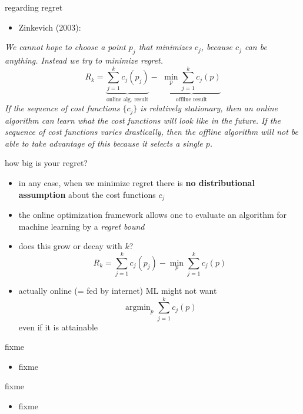 \documentclass[xcolor={svgnames},
               hyperref={colorlinks,citecolor=DeepPink4,linkcolor=FireBrick,urlcolor=Maroon}]
               {beamer}
\newcommand{\argmin}{\operatorname{argmin}}
\begin{document}
\begin{frame}{regarding regret}

\begin{itemize}
\item Zinkevich (2003): 
\end{itemize}

\emph{We cannot hope to choose a point $p_j$ that minimizes $c_j$, because $c_j$ can be anything. Instead we try to minimize regret.}
  $$R_k = \underbrace{\sum_{j=1}^k c_j(p_j)}_{\text{online alg.~result}} - \,\, \underbrace{\min_p \sum_{j=1}^k c_j(p)}_{\text{offline result}}$$
\noindent \emph{If the sequence of cost functions $\{c_j\}$ is relatively stationary, then an online algorithm can learn what the cost functions will look like in the future.  If the sequence of cost functions varies drastically, then the offline algorithm will not be able to take advantage of this because it selects a single $p$.}
\end{frame}


\begin{frame}{how big is your regret?}

\begin{itemize}
\item in any case, when we minimize regret there is \textbf{no distributional assumption} about the cost functions $c_j$
\item the online optimization framework allows one to evaluate an algorithm for machine learning by a \emph{regret bound}
\item does this grow or decay with $k$?
    $$R_k = \sum_{j=1}^k c_j(p_j) - \min_p \sum_{j=1}^k c_j(p)$$
\item actually online (= fed by internet) ML might not want
    $$\argmin_p \sum_{j=1}^k c_j(p)$$
even if it is attainable
\end{itemize}
\end{frame}


\begin{frame}{fixme}

\begin{itemize}
\item fixme
\end{itemize}
\end{frame}

\begin{frame}{fixme}

\begin{itemize}
\item fixme
\end{itemize}
\end{frame}
\end{document}
